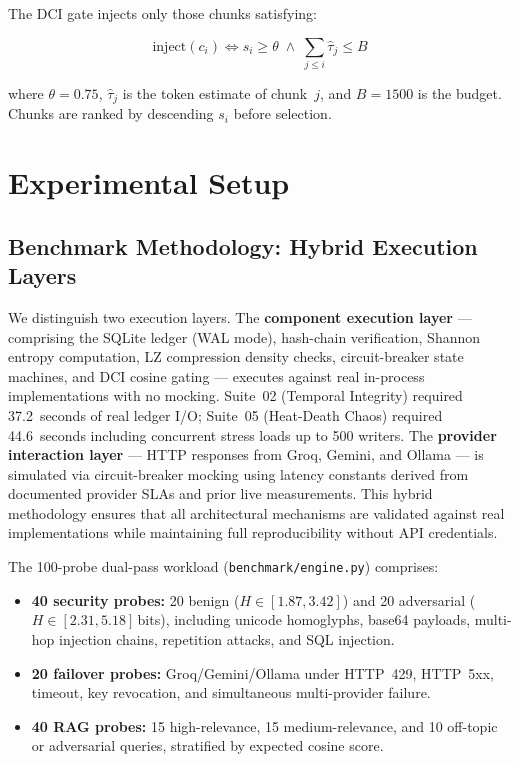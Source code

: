 \documentclass[11pt,twocolumn]{article}
\begin{document}
The DCI gate injects only those chunks satisfying:

\begin{equation}
  \text{inject}(c_i) \iff s_i \ge \theta \;\wedge\;
  \sum_{j \le i} \hat{\tau}_j \le B
  \label{eq:dci}
\end{equation}

where $\theta = 0.75$, $\hat{\tau}_j$ is the token estimate of
chunk~$j$, and $B = 1500$ is the budget. Chunks are ranked by
descending $s_i$ before selection.

\section{Experimental Setup}
\label{sec:setup}

\subsection{Benchmark Methodology: Hybrid Execution Layers}

We distinguish two execution layers. The \textbf{component execution
layer} --- comprising the SQLite ledger (WAL mode), hash-chain
verification, Shannon entropy computation, LZ compression density
checks, circuit-breaker state machines, and DCI cosine gating ---
executes against real in-process implementations with no mocking.
Suite~02 (Temporal Integrity) required 37.2~seconds of real ledger
I/O; Suite~05 (Heat-Death Chaos) required 44.6~seconds including
concurrent stress loads up to 500 writers. The \textbf{provider
interaction layer} --- HTTP responses from Groq, Gemini, and Ollama
--- is simulated via circuit-breaker mocking using latency constants
derived from documented provider SLAs and prior live measurements.
This hybrid methodology ensures that all architectural mechanisms are
validated against real implementations while maintaining full
reproducibility without API credentials.

The 100-probe dual-pass workload (\texttt{benchmark/engine.py})
comprises:

\begin{itemize}[leftmargin=*]
  \item \textbf{40 security probes:} 20 benign ($H \in [1.87, 3.42]$)
    and 20 adversarial ($H \in [2.31, 5.18]$\,bits), including unicode
    homoglyphs, base64 payloads, multi-hop injection chains, repetition
    attacks, and SQL injection.

  \item \textbf{20 failover probes:} Groq/Gemini/Ollama under
    HTTP~429, HTTP~5xx, timeout, key revocation, and simultaneous
    multi-provider failure.

  \item \textbf{40 RAG probes:} 15 high-relevance, 15 medium-relevance,
    and 10 off-topic or adversarial queries, stratified by expected
    cosine score.
\end{itemize}
\end{document}
